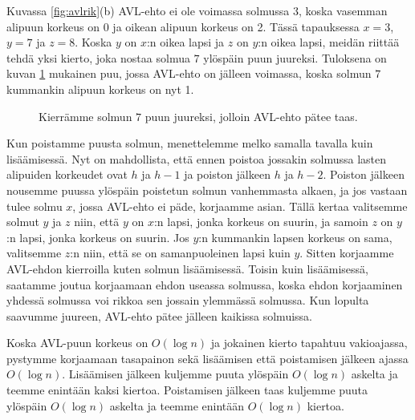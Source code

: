 Kuvassa \ref{fig:avlrik}(b) AVL-ehto ei ole voimassa solmussa $3$,
koska vasemman alipuun korkeus on 0 ja oikean alipuun korkeus on 2.
Tässä tapauksessa $x=3$, $y=7$ ja $z=8$.
Koska $y$ on $x$:n oikea lapsi ja $z$ on $y$:n oikea lapsi,
meidän riittää tehdä yksi kierto, joka nostaa solmua $7$ ylöspäin
puun juureksi.
Tuloksena on kuvan \ref{fig:avlkor} mukainen puu, jossa
AVL-ehto on jälleen voimassa,
koska solmun $7$ kummankin alipuun korkeus on nyt 1.

\begin{figure}
\center
{}
\caption{Kierrämme solmun $7$ puun juureksi, jolloin AVL-ehto pätee taas.}
\label{fig:avlkor}
\end{figure}

Kun poistamme puusta solmun, menettelemme melko samalla tavalla
kuin lisäämisessä.
Nyt on mahdollista, että ennen poistoa
jossakin solmussa lasten alipuiden korkeudet ovat $h$ ja $h-1$
ja poiston jälkeen $h$ ja $h-2$.
Poiston jälkeen nousemme puussa ylöspäin
poistetun solmun vanhemmasta alkaen, ja jos vastaan tulee solmu $x$,
jossa AVL-ehto ei päde, korjaamme asian.
Tällä kertaa valitsemme solmut $y$ ja $z$ niin,
että $y$ on $x$:n lapsi, jonka korkeus on suurin,
ja samoin $z$ on $y$:n lapsi, jonka korkeus on suurin.
Jos $y$:n kummankin lapsen korkeus on sama,
valitsemme $z$:n niin, että se on samanpuoleinen lapsi kuin $y$.
Sitten korjaamme AVL-ehdon kierroilla kuten solmun lisäämisessä.
Toisin kuin lisäämisessä, saatamme joutua korjaamaan ehdon
useassa solmussa,
koska ehdon korjaaminen yhdessä solmussa voi rikkoa
sen jossain ylemmässä solmussa.
Kun lopulta saavumme juureen, AVL-ehto pätee jälleen kaikissa solmuissa.

Koska AVL-puun korkeus on $O(\log n)$ ja jokainen kierto
tapahtuu vakioajassa,
pystymme korjaamaan tasapainon sekä lisäämisen että poistamisen
jälkeen ajassa $O(\log n)$.
Lisäämisen jälkeen kuljemme puuta ylöspäin $O(\log n)$ askelta
ja teemme enintään kaksi kiertoa.
Poistamisen jälkeen taas kuljemme puuta ylöspäin $O(\log n)$ askelta
ja teemme enintään $O(\log n)$ kiertoa.

